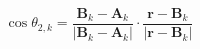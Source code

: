 \documentclass[border=2pt,varwidth]{standalone}
\begin{document}
\[
  \cos \theta_{2,k} =
  \frac{\mathbf{B}_k - \mathbf{A}_k}
       {\left | \mathbf{B}_k - \mathbf{A}_k \right |}
  \cdot
  \frac{\mathbf{r} - \mathbf{B}_k}
       {\left | \mathbf{r} - \mathbf{B}_k \right |}
\]
\end{document}
